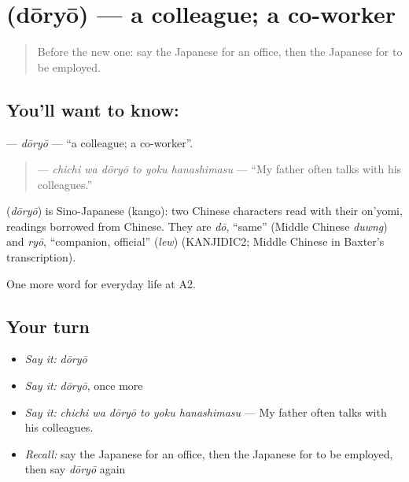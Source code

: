 \section[\texorpdfstring{\ja{どうりょう} (dōryō)}{どうりょう (dōryō)}]{ (dōryō) — a colleague; a co-worker}

\label{lesson:JA-C229-douryou}



\begin{quote}
Before the new one: say the Japanese for an office, then the Japanese for to be employed.
\end{quote}

\subsection*{You'll want to know: }
\textbf{} — \emph{dōryō} — \textquotedblleft{}a colleague; a co-worker\textquotedblright{}.

\begin{quote}
\textbf{   } — \emph{chichi wa dōryō to yoku hanashimasu} — \textquotedblleft{}My father often talks with his colleagues.\textquotedblright{}
\end{quote}

\begin{cousinweb}
\textbf{} (\emph{dōryō}) is Sino-Japanese (kango): two Chinese characters read with their on'yomi, readings borrowed from Chinese. They are \emph{dō}, \textquotedblleft{}same\textquotedblright{} (Middle Chinese \emph{duwng}) and \emph{ryō}, \textquotedblleft{}companion, official\textquotedblright{} (\emph{lew}) (KANJIDIC2; Middle Chinese in Baxter's transcription).
\end{cousinweb}

\begin{grammarlens}[title={What you've built}]
One more word for everyday life at A2.
\end{grammarlens}

\subsection*{Your turn}
\begin{itemize}
\raggedright
  \item \emph{Say it:} \emph{dōryō}
  \item \emph{Say it:} \emph{dōryō}, once more
  \item \emph{Say it:} \emph{chichi wa dōryō to yoku hanashimasu} — My father often talks with his colleagues.
  \item \emph{Recall:} say the Japanese for an office, then the Japanese for to be employed, then say \emph{dōryō} again
\end{itemize}

